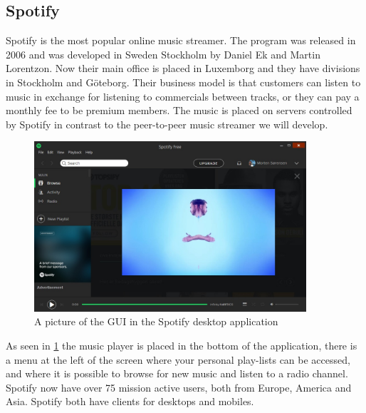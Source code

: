 \subsection{Spotify}
Spotify is the most popular online music streamer. The program was released in 2006 and was developed in Sweden Stockholm by Daniel Ek and Martin Lorentzon. Now their main office is placed in Luxemborg and they have divisions in Stockholm and Göteborg. Their business model is that customers can listen to music in exchange for listening to commercials between tracks, or they can pay a monthly fee to be premium members.
The music is placed on servers controlled by Spotify in contrast to the peer-to-peer music streamer we will develop.
\begin{figure}[H]
  \centering
    \includegraphics[width=0.9\textwidth]{gfx/Spotify_desktop.jpg}
  \caption{A picture of the \acs{GUI} in the Spotify desktop application}
  \label{fig:spotify}
\end{figure}
As seen in \ref{fig:spotify} the music player is placed in the bottom of the application, there is a menu at the left of the screen where your personal play-lists can be accessed, and where it is possible to browse for new music and listen to a radio channel.
Spotify now have over 75 mission active users, both from Europe, America and Asia. Spotify both have clients for desktops and mobiles.

